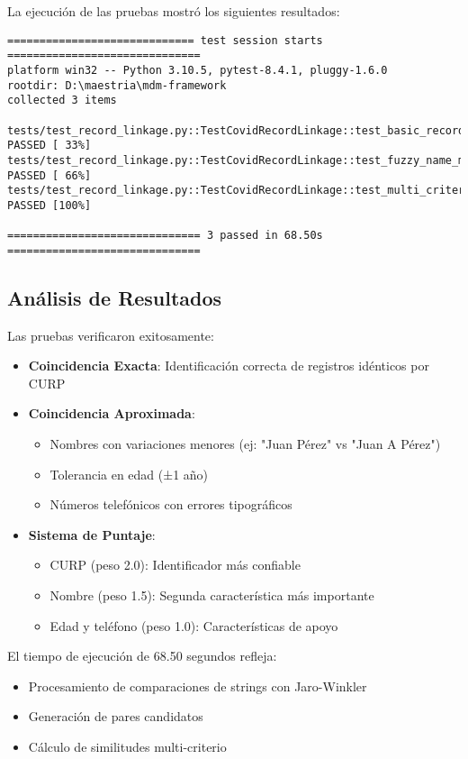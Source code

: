 \documentclass[12pt]{article}
\begin{document}
La ejecución de las pruebas mostró los siguientes resultados:

\begin{verbatim}
============================= test session starts ==============================
platform win32 -- Python 3.10.5, pytest-8.4.1, pluggy-1.6.0
rootdir: D:\maestria\mdm-framework
collected 3 items

tests/test_record_linkage.py::TestCovidRecordLinkage::test_basic_record_linkage PASSED [ 33%]
tests/test_record_linkage.py::TestCovidRecordLinkage::test_fuzzy_name_matching PASSED [ 66%]
tests/test_record_linkage.py::TestCovidRecordLinkage::test_multi_criteria_matching PASSED [100%]

============================== 3 passed in 68.50s ==============================
\end{verbatim}

\subsection{Análisis de Resultados}

Las pruebas verificaron exitosamente:

\begin{itemize}
    \item \textbf{Coincidencia Exacta}: Identificación correcta de registros idénticos por CURP
    \item \textbf{Coincidencia Aproximada}: 
    \begin{itemize}
        \item Nombres con variaciones menores (ej: "Juan Pérez" vs "Juan A Pérez")
        \item Tolerancia en edad (±1 año)
        \item Números telefónicos con errores tipográficos
    \end{itemize}
    \item \textbf{Sistema de Puntaje}: 
    \begin{itemize}
        \item CURP (peso 2.0): Identificador más confiable
        \item Nombre (peso 1.5): Segunda característica más importante
        \item Edad y teléfono (peso 1.0): Características de apoyo
    \end{itemize}
\end{itemize}

El tiempo de ejecución de 68.50 segundos refleja:
\begin{itemize}
    \item Procesamiento de comparaciones de strings con Jaro-Winkler
    \item Generación de pares candidatos
    \item Cálculo de similitudes multi-criterio
\end{itemize}
\end{document}

